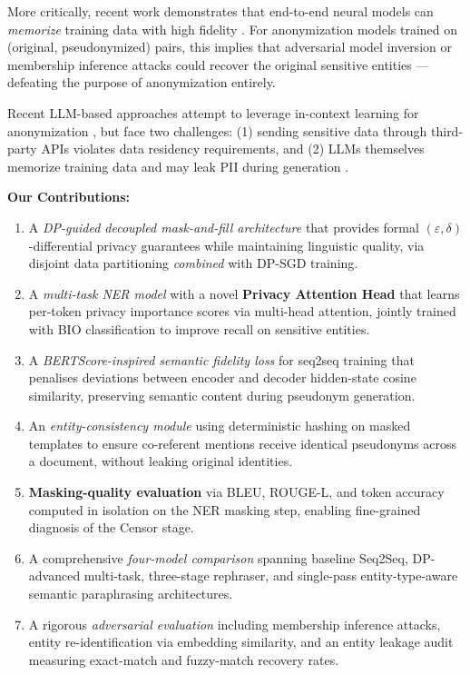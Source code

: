 \documentclass[9pt]{article}
\begin{document}
More critically, recent work demonstrates that end-to-end neural models can \textit{memorize} training data with high fidelity \cite{carlini2021extracting, carlini2022quantifying}. For anonymization models trained on (original, pseudonymized) pairs, this implies that adversarial model inversion or membership inference attacks \cite{shokri2017membership} could recover the original sensitive entities --- defeating the purpose of anonymization entirely.

Recent LLM-based approaches attempt to leverage in-context learning for anonymization \cite{staab2024llm_privacy}, but face two challenges: (1) sending sensitive data through third-party APIs violates data residency requirements, and (2) LLMs themselves memorize training data and may leak PII during generation \cite{lukas2023analyzing}.

\textbf{Our Contributions:}
\begin{enumerate}
    \item A \textit{DP-guided decoupled mask-and-fill architecture} that provides formal $(\varepsilon, \delta)$-differential privacy guarantees while maintaining linguistic quality, via disjoint data partitioning \textit{combined} with DP-SGD training.
    \item A \textit{multi-task NER model} with a novel \textbf{Privacy Attention Head} that learns per-token privacy importance scores via multi-head attention, jointly trained with BIO classification to improve recall on sensitive entities.
    \item A \textit{BERTScore-inspired semantic fidelity loss} for seq2seq training that penalises deviations between encoder and decoder hidden-state cosine similarity, preserving semantic content during pseudonym generation.
    \item An \textit{entity-consistency module} using deterministic hashing on masked templates to ensure co-referent mentions receive identical pseudonyms across a document, without leaking original identities.
    \item \textbf{Masking-quality evaluation} via BLEU, ROUGE-L, and token accuracy computed in isolation on the NER masking step, enabling fine-grained diagnosis of the Censor stage.
    \item A comprehensive \textit{four-model comparison} spanning baseline Seq2Seq, DP-advanced multi-task, three-stage rephraser, and single-pass entity-type-aware semantic paraphrasing architectures.
    \item A rigorous \textit{adversarial evaluation} including membership inference attacks, entity re-identification via embedding similarity, and an entity leakage audit measuring exact-match and fuzzy-match recovery rates.
\end{enumerate}
\end{document}
